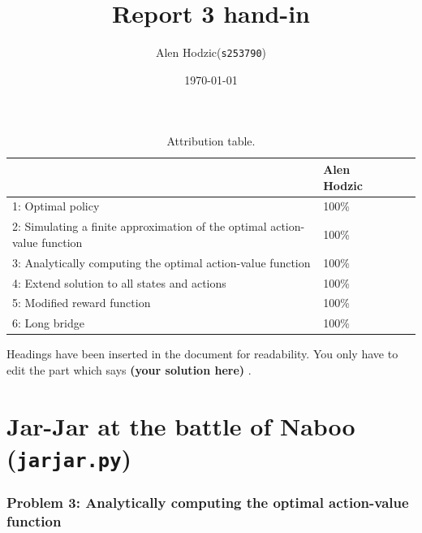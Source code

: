 \documentclass[12pt,twoside]{article}
\title{ Report 3 hand-in }
\date{ \today }
\author{Alen Hodzic(\texttt{s253790})}
\newcommand\redt[1]{ {\textcolor[rgb]{0.60, 0.00, 0.00}{\textbf{ #1} } } }
\newcommand{\yoursolution}{ \redt{(your solution here) } }
\begin{document}
\maketitle

\begin{table}[ht!]
\caption{Attribution table.}
\begin{tabular}{llll}
\toprule
                                                                           & Alen Hodzic  &  &  \\
\midrule
 1: Optimal policy                                                         & 100\%  &  &  \\
 2: Simulating a finite approximation of the optimal action-value function & 100\%  &  &  \\
 3: Analytically computing the optimal action-value function               & 100\%  &  &  \\
 4: Extend solution to all states and actions                              & 100\%  &  &  \\
 5: Modified reward function                                               & 100\%  &  &  \\
 6: Long bridge                                                            & 100\%  &  &  \\
\bottomrule
\end{tabular}
\end{table}


Headings have been inserted in the document for readability. You only have to edit the part which says \yoursolution. 

\section{Jar-Jar at the battle of Naboo (\texttt{jarjar.py})}
\subsubsection*{{\color{red}Problem 3:  Analytically computing the optimal action-value function}}
	
\end{document}
